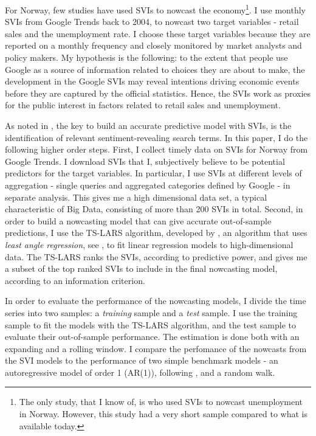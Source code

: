 For Norway, few studies have used SVIs to nowcast the economy\footnote{The only study, that I know of, is \textcite{anvik2010} who used SVIs to nowcast unemployment in Norway. However, this study had a very short sample compared to what is available today.}. I use monthly SVIs from Google Trends back to 2004, to nowcast two target variables - retail sales and the unemployment rate. I choose these target variables because they are reported on a monthly frequency and closely monitored by market analysts and policy makers. My hypothesis is the following: to the extent that people use Google as a source of information related to choices they are about to make, the development in the Google SVIs may reveal intentions driving economic events before they are captured by the official statistics. Hence, the SVIs work as proxies for the public interest in factors related to retail sales and unemployment.

As noted in \textcite{da2015}, the key to build an accurate predictive model with SVIs, is the identification of relevant sentiment-revealing search terms. In this paper, I do the following higher order steps. First, I collect timely data on SVIs for Norway from Google Trends. I download SVIs that I, subjectively believe to be potential predictors for the target variables. In particular, I use SVIs at different levels of aggregation - single queries and aggregated categories defined by Google - in separate analysis. This gives me a high dimensional data set, a typical characteristic of Big Data, consisting of more than 200 SVIs in total. Second, in order to build a nowcasting model that can give accurate out-of-sample predictions, I use the TS-LARS algorithm, developed by \textcite{gelper2008}, an algorithm that uses \textit{least angle regression}, see \textcite{efron2004}, to fit linear regression models to high-dimensional data. The TS-LARS ranks the SVIs, according to predictive power, and gives me a subset of the top ranked SVIs to include in the final nowcasting model, according to an information criterion.

In order to evaluate the performance of the nowcasting models, I divide the time series into two samples: a \textit{training} sample and a \textit{test} sample. I use the training sample to fit the models with the TS-LARS algorithm, and the test sample to evaluate their out-of-sample performance. The estimation is done both with an expanding and a rolling window. I compare the perfomance of the nowcasts from the SVI models to the performance of two simple benchmark models - an autoregressive model of order 1 (AR(1)), following \textcite{choi2012}, and a random walk.

